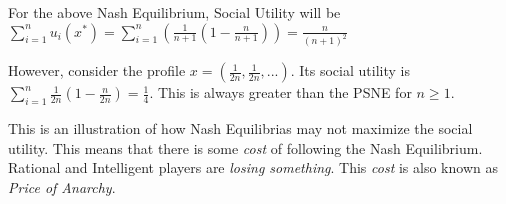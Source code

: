 For the above Nash Equilibrium, Social Utility will be $\sum_{i=1}^{n}u_i(x^*) = \sum_{i=1}^{n}(\frac{1}{n+1}(1 - \frac{n}{n+1})) = \frac{n}{(n+1)^2}$

However, consider the profile $x = (\frac{1}{2n}, \frac{1}{2n}, ...)$. Its social utility is $\sum_{i=1}^{n}\frac{1}{2n}(1 - \frac{n}{2n}) = \frac{1}{4}$. This is always greater than the PSNE for $n \geq 1$. 

This is an illustration of how Nash Equilibrias may not maximize the social utility. This means that there is some \textit{cost} of following the Nash Equilibrium. Rational and Intelligent players are \textit{losing something}. This \textit{cost} is also known as \textit{Price of Anarchy}.



